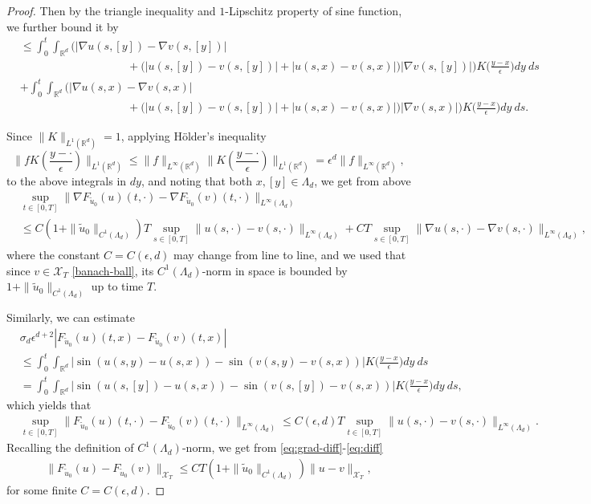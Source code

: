 \documentclass[a4paper,11pt]{amsart}
\newcommand{\red}[1]{{#1}}
\newcommand{\R}{\mathbb{R}}
\newcommand{\ep}{\epsilon}
\newcommand{\cX}{\mathcal{X}}
\numberwithin{equation}{section}
\numberwithin{theorem}{section}
\theoremstyle{definition}
\begin{document}
\begin{proof}
Then by the triangle inequality and $1$-Lipschitz property of sine function, we further bound it by
\begin{align*}
& \le \int_0^t\int_{\R^d}\Big(|\nabla u(s,[y])-\nabla v(s,[y])| \\
&\hspace{4cm}+\big(|u(s,[y])-v(s,[y])|+|u(s,x)-v(s,x)|\big)|\nabla v(s,[y])|\Big)K\Big(\frac{y-x}{\ep}\Big)dy\:ds\\
&+\int_0^t\int_{\R^d}\Big(|\nabla u(s,x)-\nabla v(s,x)| \\
&\hspace{4cm}+\big(|u(s,[y])-v(s,[y])|+|u(s,x)-v(s,x)|\big)|\nabla v(s,x)|\Big)K\Big(\frac{y-x}{\ep}\Big)dy\:ds.
\end{align*}


Since $\|K\|_{L^1(\R^d)}=1$, applying \red{H\"older's inequality $$\|fK(\frac{y - \cdot}{\ep})\|_{L^1(\R^d)}\le \|f\|_{L^\infty(\R^d)}\|K(\frac{y-\cdot}{\ep})\|_{L^1(\R^d)} = \ep^d\|f\|_{L^\infty(\R^d)},$$ to the above integrals in $dy$, and noting that both $x,[y]\in\Lambda_d$}, we get from above
\begin{align}\label{eq:grad-diff}
&\sup_{t\in[0,T]}\|\nabla F_{\tilde u_0}(u)(t,\cdot)-\nabla F_{\tilde u_0}(v)(t,\cdot)\|_{L^\infty(\Lambda_d)}\\
&\le C\left(1+\|\tilde u_0\|_{C^1(\Lambda_d)}\right)T \sup_{s\in[0,T]}\|u(s,\cdot)-v(s,\cdot)\|_{L^\infty(\Lambda_d)}+CT \sup_{s\in[0,T]}\|\nabla u(s,\cdot)-\nabla v(s,\cdot)\|_{L^\infty(\Lambda_d)}, \nonumber
\end{align} 
where the constant $C=C(\ep, d)$ may change from line to line, and we used that since $v\in \cX_T$ \eqref{banach-ball}, its $C^1(\Lambda_d)$-norm in space is bounded by $1+\|\tilde u_0\|_{C^1(\Lambda_d)}$ up to time $T$.

Similarly, we can estimate 
\begin{align*}
&\sigma_d\ep^{d+2} |F_{\tilde u_0}(u)(t,x)-F_{\tilde u_0}(v)(t,x)| \\
& \leq \int_0^t\int_{\R^d}\Big|\sin\left(u(s,y)-u(s,x)\right)-\sin\left(v(s,y)-v(s,x)\right)\Big|K\Big(\frac{y-x}{\ep}\Big)dy\:ds \\
&= \red{\int_0^t\int_{\R^d}\Big|\sin\left(u(s,[y])-u(s,x)\right)-\sin\left(v(s,[y])-v(s,x)\right)\Big|K\Big(\frac{y-x}{\ep}\Big)dy\:ds,}
\end{align*}
which yields that
\begin{align}\label{eq:diff}
&\sup_{t\in[0,T]}\|F_{\tilde u_0}(u)(t,\cdot)-F_{\tilde u_0}(v)(t,\cdot)\|_{L^\infty(\Lambda_d)}\le C(\ep, d)T \sup_{t\in[0,T]}\|u(s,\cdot)-v(s,\cdot)\|_{L^\infty(\Lambda_d)}.
\end{align}
Recalling the definition of $C^1(\Lambda_d)$-norm, we get from \eqref{eq:grad-diff}-\eqref{eq:diff}
\begin{align*}
\|F_{\tilde u_0}(u)-F_{\tilde u_0}(v)\|_{\cX_T}\le CT\left(1+\|\tilde u_0\|_{C^1(\Lambda_d)}\right)\|u-v\|_{\cX_T},
\end{align*}
for some finite $C=C(\ep, d)$. 


\end{proof}
\end{document}
